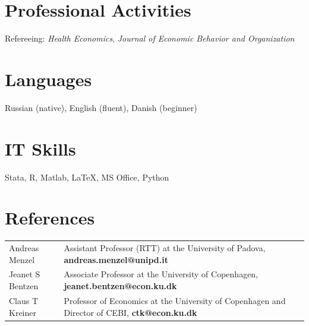 \documentclass[letterpaper]{article}
\begin{document}
\vspace{+0.1cm}
\section*{Professional Activities}
\vspace{-0.5cm}
\noindent {\color{grey} \rule{\linewidth}{0.1mm}}
Refereeing: \textit{Health Economics}, \textit{Journal of Economic Behavior and Organization}

\vspace{+0.1cm}
\section*{Languages}
\vspace{-0.5cm}
\noindent {\color{grey} \rule{\linewidth}{0.1mm}}
Russian (native), English (fluent), Danish (beginner)

\vspace{+0.1cm}
\section*{IT Skills}
\vspace{-0.5cm}
\noindent {\color{grey} \rule{\linewidth}{0.1mm}}
Stata, R, Matlab, LaTeX, MS Office, Python

\vspace{+0.1cm}
\section*{References}
\vspace{-0.5cm}
\noindent {\color{grey} \rule{\linewidth}{0.1mm}}
\begin{tabular}{ p{} p{}  }
Andreas Menzel & Assistant Professor (RTT) at the University of Padova, \textbf{andreas.menzel@unipd.it} \\
Jeanet S Bentzen & Associate Professor at the University of Copenhagen, \textbf{jeanet.bentzen@econ.ku.dk}\\
Claus T Kreiner & Professor of Economics at the University of Copenhagen and Director of CEBI, \textbf{ctk@econ.ku.dk} \\
\end{tabular}
\end{document}

